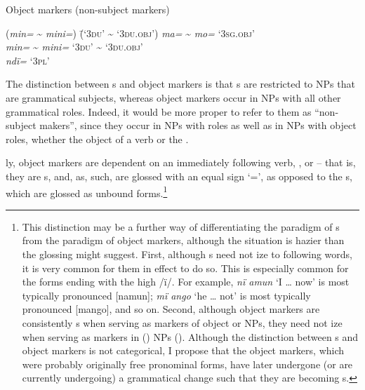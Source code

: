\ea%
    \label{ex:det:30}
          Object markers (non-subject markers)\\
\begin{tabbing}
{(\textit{min=} {\textasciitilde} \textit{mini=})} \= {(‘\textsc{3du}’ {\textasciitilde} \textsc{‘3du.obj’})}\kill
{\textit{ma=} {\textasciitilde} \textit{mo=}} \> {‘3\textsc{sg.obj}’}\\
{\textit{min=} {\textasciitilde} \textit{mini=}} \> {\textsc{‘3du’} \textsc{{\textasciitilde} ‘3du.obj}’}\\
{\textit{ndï=}} \> {‘3\textsc{pl}’}
\end{tabbing}
\z

The  distinction between s and object markers is that s are restricted to NPs that are grammatical subjects, whereas object markers occur in NPs with all other grammatical roles. Indeed, it would be more proper to refer to them as “non-subject makers”, since they occur in NPs with  roles as well as in NPs with object roles, whether the object of a verb or the . 

ly, object markers are dependent on an immediately following verb, , or  -- that is, they are s, and, as, such, are glossed with an equal sign ‘=’, as opposed to the s, which are glossed as unbound forms.\footnote{This  distinction may be a further way of differentiating the paradigm of s from the paradigm of object markers, although the situation is hazier than the glossing might suggest. First, although s need not ize to following words, it is very common for them in effect to do so. This is especially common for the forms ending with the high  /ï/. For example, \textit{nï amun} ‘I … now’ is most typically pronounced [namun]; \textit{mï ango} ‘he … not’ is most typically pronounced [mango], and so on. Second, although object markers are consistently s when serving as markers of object or  NPs, they need not ize when serving as markers in  () NPs (). Although the  distinction between s and object markers is not categorical, I propose that the object markers, which were probably originally free pronominal forms, have later undergone (or are currently undergoing) a  grammatical change such that they are becoming s.}

